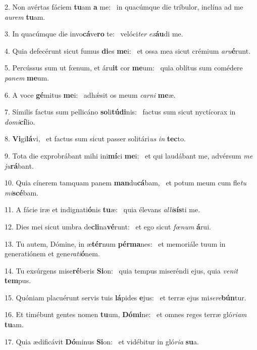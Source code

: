 2. Non avértas fáciem \textbf{tu}am \textbf{a} me: \ast\  in quacúmque die tríbulor, inclína ad me \textit{au}\textit{rem} \textbf{tu}am.\

3. In quacúmque die invo\textbf{cá}ve\textbf{ro} te: \ast\  velóci\textit{ter} \textit{ex}\textbf{áu}di me.\

4. Quia defecérunt sicut fumus \textbf{di}es \textbf{me}i: \ast\  et ossa mea sicut crémium \textit{a}\textit{ru}\textbf{é}runt.\

5. Percússus sum ut fœnum, et áru\textbf{it} cor \textbf{me}um: \ast\  quia oblítus sum comédere \textit{pa}\textit{nem} \textbf{me}um.\

6. A voce \textbf{gé}mitus \textbf{me}i: \ast\  adhǽsit os meum \textit{car}\textit{ni} \textbf{me}æ.\

7. Símilis factus sum pellicáno \textbf{so}li\textbf{tú}\textbf{di}nis: \ast\  factus sum sicut nyctícorax in \textit{do}\textit{mi}\textbf{cí}lio.\

8. \textbf{Vi}gi\textbf{lá}vi, \ast\  et factus sum sicut passer solitári\textit{us} \textit{in} \textbf{tec}to.\

9. Tota die exprobrábant mihi ini\textbf{mí}ci \textbf{me}i: \ast\  et qui laudábant me, advérsum \textit{me} \textit{ju}\textbf{rá}bant.\

10. Quia cínerem tamquam panem \textbf{man}du\textbf{cá}bam, \ast\  et potum meum cum fle\textit{tu} \textit{mi}\textbf{scé}bam.\

11. A fácie iræ et indignati\textbf{ó}nis \textbf{tu}æ: \ast\  quia élevans \textit{al}\textit{li}\textbf{sís}ti me.\

12. Dies mei sicut umbra de\textbf{cli}na\textbf{vé}runt: \ast\  et ego sicut \textit{fœ}\textit{num} \textbf{á}rui.\

13. Tu autem, Dómine, in æ\textbf{tér}num \textbf{pér}\textbf{ma}nes: \ast\  et memoriále tuum in generatiónem et gene\textit{ra}\textit{ti}\textbf{ó}nem.\

14. Tu exsúrgens mise\textbf{ré}beris \textbf{Si}on: \ast\  quia tempus miseréndi ejus, quia \textit{ve}\textit{nit} \textbf{tem}pus.\

15. Quóniam placuérunt servis tuis \textbf{lá}pides \textbf{e}jus: \ast\  et terræ ejus mi\textit{se}\textit{re}\textbf{bún}tur.\

16. Et timébunt gentes nomen \textbf{tu}um, \textbf{Dó}\textbf{mi}ne: \ast\  et omnes reges terræ gló\textit{ri}\textit{am} \textbf{tu}am.\

17. Quia ædificávit \textbf{Dó}minus \textbf{Si}on: \ast\  et vidébitur in gló\textit{ri}\textit{a} \textbf{su}a.\

